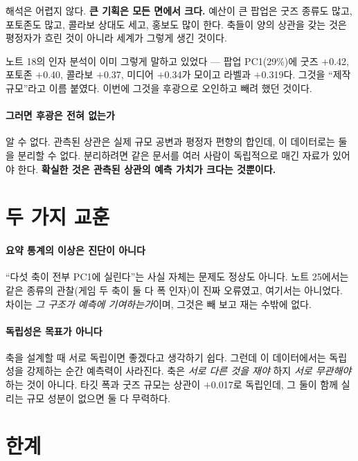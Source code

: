 \documentclass[10pt]{article}
\begin{document}
해석은 어렵지 않다. \textbf{큰 기획은 모든 면에서 크다.} 예산이 큰 팝업은 굿즈
종류도 많고, 포토존도 많고, 콜라보 상대도 세고, 홍보도 많이 한다. 축들이 양의
상관을 갖는 것은 평정자가 흐린 것이 아니라 세계가 그렇게 생긴 것이다.

노트 18의 인자 분석이 이미 그렇게 말하고 있었다 --- 팝업 PC1(29\%)에 굿즈
$+$0.42, 포토존 $+$0.40, 콜라보 $+$0.37, 미디어 $+$0.34가 모이고 라벨과 $+$0.319다.
그것을 ``제작 규모''라고 이름 붙였다. 이번에 그것을 후광으로 오인하고 빼려 했던
것이다.

\paragraph{그러면 후광은 전혀 없는가}
알 수 없다. 관측된 상관은 실제 규모 공변과 평정자 편향의 합인데, 이 데이터로는
둘을 분리할 수 없다. 분리하려면 같은 문서를 여러 사람이 독립적으로 매긴 자료가
있어야 한다. \textbf{확실한 것은 관측된 상관의 예측 가치가 크다는 것뿐이다.}


\section{두 가지 교훈}

\paragraph{요약 통계의 이상은 진단이 아니다}
``다섯 축이 전부 PC1에 실린다''는 사실 자체는 문제도 정상도 아니다. 노트 25에서는
같은 종류의 관찰(게임 두 축이 둘 다 폭 인자)이 진짜 오류였고, 여기서는 아니었다.
차이는 \emph{그 구조가 예측에 기여하는가}이며, 그것은 빼 보고 재는 수밖에 없다.

\paragraph{독립성은 목표가 아니다}
축을 설계할 때 서로 독립이면 좋겠다고 생각하기 쉽다. 그런데 이 데이터에서는
독립성을 강제하는 순간 예측력이 사라진다. 축은 \emph{서로 다른 것을 재야} 하지
\emph{서로 무관해야} 하는 것이 아니다. 타깃 폭과 굿즈 규모는 상관이 $+$0.017로
독립인데, 그 둘이 함께 실리는 규모 성분이 없으면 둘 다 무력하다.

\section{한계}
\end{document}
